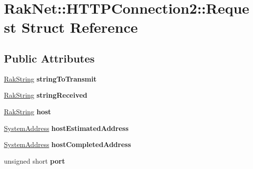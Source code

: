 \hypertarget{struct_rak_net_1_1_h_t_t_p_connection2_1_1_request}{\section{Rak\-Net\-:\-:H\-T\-T\-P\-Connection2\-:\-:Request Struct Reference}
\label{struct_rak_net_1_1_h_t_t_p_connection2_1_1_request}
}
\subsection*{Public Attributes}
\begin{DoxyCompactItemize}
\item 
\hypertarget{struct_rak_net_1_1_h_t_t_p_connection2_1_1_request_a6f47e4810ed2bcb758a89279b494fb51}{\hyperlink{class_rak_net_1_1_rak_string}{Rak\-String} {\bfseries string\-To\-Transmit}}\label{struct_rak_net_1_1_h_t_t_p_connection2_1_1_request_a6f47e4810ed2bcb758a89279b494fb51}

\item 
\hypertarget{struct_rak_net_1_1_h_t_t_p_connection2_1_1_request_a8a40053eed074f0ac92f66b89eea1d7f}{\hyperlink{class_rak_net_1_1_rak_string}{Rak\-String} {\bfseries string\-Received}}\label{struct_rak_net_1_1_h_t_t_p_connection2_1_1_request_a8a40053eed074f0ac92f66b89eea1d7f}

\item 
\hypertarget{struct_rak_net_1_1_h_t_t_p_connection2_1_1_request_abed2c21efc2a6877a7a9184a6a0b9c56}{\hyperlink{class_rak_net_1_1_rak_string}{Rak\-String} {\bfseries host}}\label{struct_rak_net_1_1_h_t_t_p_connection2_1_1_request_abed2c21efc2a6877a7a9184a6a0b9c56}

\item 
\hypertarget{struct_rak_net_1_1_h_t_t_p_connection2_1_1_request_af3ac60b8e85362b14ed04fa8bfccedf9}{\hyperlink{struct_rak_net_1_1_system_address}{System\-Address} {\bfseries host\-Estimated\-Address}}\label{struct_rak_net_1_1_h_t_t_p_connection2_1_1_request_af3ac60b8e85362b14ed04fa8bfccedf9}

\item 
\hypertarget{struct_rak_net_1_1_h_t_t_p_connection2_1_1_request_a1585ad305e59099db5ecfe5fc79e8128}{\hyperlink{struct_rak_net_1_1_system_address}{System\-Address} {\bfseries host\-Completed\-Address}}\label{struct_rak_net_1_1_h_t_t_p_connection2_1_1_request_a1585ad305e59099db5ecfe5fc79e8128}

\item 
\hypertarget{struct_rak_net_1_1_h_t_t_p_connection2_1_1_request_ac3a524d144868875c10a8ed1820ac9c2}{unsigned short {\bfseries port}}\label{struct_rak_net_1_1_h_t_t_p_connection2_1_1_request_ac3a524d144868875c10a8ed1820ac9c2}


\end{DoxyCompactItemize}
